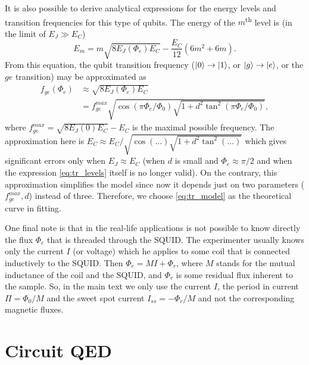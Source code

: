 \documentclass[%
 aip,
 amsmath,amssymb,
 reprint,%
]{revtex4-1}
\begin{document}
It is also possible to derive analytical expressions for the energy levels and transition frequencies for this type of qubits. The energy of the $m$\textsuperscript{th} level is (in the limit of $E_J\gg E_C$) \cite{koch2007}
\begin{equation}
E_m = m \sqrt{8E_J(\Phi_e) E_C} -\frac{E_C}{12}(6m^2+6m).
\label{eq:tr_levels}
\end{equation}
From this equation, the qubit transition frequency ($ \ket{0}\rightarrow \ket{1}$, or $ \ket{g}\rightarrow \ket{e}$, or the $ge$ transition) may be approximated as 
\begin{equation}
\begin{aligned}
f_{ge}(\Phi_e) &\approx \sqrt{8 E_J (\Phi_e) E_C} \\
&= f_{ge}^{max} \sqrt{\cos\left(\pi \Phi_e/\Phi_0\right) \sqrt{1+d^2 \tan^2 \left(\pi \Phi_e/\Phi_0\right)}},
\end{aligned}
\label{eq:tr_model}
\end{equation}
where $f_{ge}^{max} = \sqrt{8 E_J(0) E_C}-E_C$ is the maximal possible frequency. The approximation here is $E_C \approx E_C/\sqrt{\cos\left(\dots\right) \sqrt{1+d^2 \tan^2 \left(\dots\right)}}$  which gives significant errors only when $E_J\approx E_C$ (when $d$ is small and $\Phi_e\approx\pi/2$ and when the expression \eqref{eq:tr_levels} itself is no longer valid). On the contrary, this approximation simplifies the model since now it depends just on two parameters ($f_{ge}^{max}, d$) instead of three. Therefore, we choose \eqref{eq:tr_model} as the theoretical curve in fitting.

One final note is that in the real-life applications is not possible to know directly the flux $\Phi_e$ that is threaded through the SQUID. The experimenter usually knows only the current $I$ (or voltage) which he applies to some coil that is connected inductively to the SQUID. Then $\Phi_e = M I + \Phi_r$, where $M$ stands for the mutual inductance of the coil and the SQUID, and $\Phi_r$ is some residual flux inherent to the sample. So, in the main text we only use the current $I$, the period in current $\Pi = \Phi_0/M$ and the sweet spot current $I_{ss} = -\Phi_r/M$ and not the corresponding magnetic fluxes.

\section{Circuit QED}\label{sec:cqed}
\end{document}
